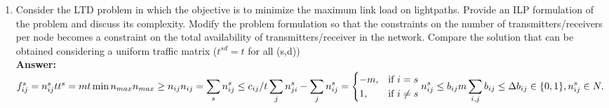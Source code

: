 \documentclass[a4paper]{article}
\begin{document}
\begin{enumerate}
\item Consider the LTD problem in which the objective is to minimize the maximum link load on lightpaths. Provide an ILP formulation of the problem and discuss its complexity. Modify the problem formulation so that the constraints  on  the  number  of   transmitters/receivers  per  node  becomes  a  constraint on  the  total   availability  of  transmitters/receiver  in  the  network. Compare the solution that  can  be  obtained  considering  a  uniform  traffic  matrix  ($t^{sd}=t$  for all (s,d))\\
\textbf{Answer:}\\
\begin{math}
f_{ij}^{s} = n_{ij}^st\\
t^s = mt\\
\min n_{max}\\
n_{max} \ge n_{ij} \\
n_{ij} = \displaystyle\sum\limits_{s} {n_{ij}^{s}} \le c_{ij}/t \\
\displaystyle\sum\limits_{j} {n_{ji}^{s}} - \displaystyle\sum\limits_{j} {n_{ij}^{s}} =
  \begin{cases}
  -m, &\text{if $i = s$}\\
  1, &\text{if $i \neq s$}
  \end{cases} \\
n_{ij}^{s} \le b_{ij}m\\
\displaystyle\sum\limits_{i,j} {b_{ij}} \le \Delta \\
b_{ij} \in \{0,1\}, n_{ij}^s \in N.
\end{math}


\end{enumerate}
\end{document}
